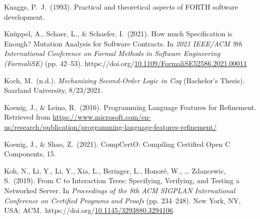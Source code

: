 \documentclass[12pt,twoside]{article}
\begin{document}
{\begin{thebibliography}{1079}
\mdbibitemlabel{}Knaggs, P.~J.~(1993). Practical and theoretical aspects of FORTH software development.%

\mdbibitemlabel{}Knüppel, A., Schaer, L., \& Schaefer, I.~(2021). How much Specification is Enough? Mutation Analysis for Software Contracts. In \emph{2021 IEEE/ACM 9th International Conference on Formal Methods in Software Engineering (FormaliSE)} (pp. 42–53). https://doi.org/\href{https://dx.doi.org/10.1109/FormaliSE52586.2021.00011}{10.1109/FormaliSE52586.2021.00011}%

\mdbibitemlabel{}Koch, M.~(n.d.). \emph{Mechanizing Second-Order Logic in Coq} (Bachelor’s Thesis). Saarland University, 8/23/2021.%

\mdbibitemlabel{}Koenig, J., \& Leino, R.~(2016). Programming Language Features for Refinement. Retrieved from \href{https://www.microsoft.com/en-us/research/publication/programming-language-features-refinement/}{{\ttfamily https://\hspace{0pt}www.\hspace{0pt}microsoft.\hspace{0pt}com/\hspace{0pt}en-\hspace{0pt}us/\hspace{0pt}research/\hspace{0pt}publication/\hspace{0pt}programming-\hspace{0pt}language-\hspace{0pt}features-\hspace{0pt}refinement/\hspace{0pt}}}%

\mdbibitemlabel{}Koenig, J., \& Shao, Z.~(2021). CompCertO: Compiling Certified Open C Components, 15.%

\mdbibitemlabel{}Koh, N., Li, Y., Li, Y., Xia, L., Beringer, L., Honoré, W., … Zdancewic, S.~(2019). From C to Interaction Trees: Specifying, Verifying, and Testing a Networked Server. In \emph{Proceedings of the 8th ACM SIGPLAN International Conference on Certified Programs and Proofs} (pp. 234–248). New York, NY, USA: ACM.~https://doi.org/\href{https://dx.doi.org/10.1145/3293880.3294106}{10.1145/3293880.3294106}%


\end{thebibliography}}
\end{document}
